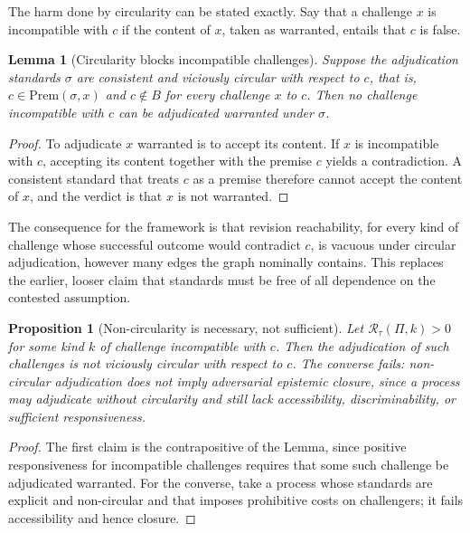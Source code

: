 \documentclass[11pt]{article}
\newtheorem{proposition}{Proposition}
\newtheorem{lemma}{Lemma}
\theoremstyle{remark}
\begin{document}
The harm done by circularity can be stated exactly. Say that a challenge $x$ is incompatible with $c$ if the content of $x$, taken as warranted, entails that $c$ is false.

\begin{lemma}[Circularity blocks incompatible challenges]
Suppose the adjudication standards $\sigma$ are consistent and viciously circular with respect to $c$, that is, $c\in\mathrm{Prem}(\sigma,x)$ and $c\notin B$ for every challenge $x$ to $c$. Then no challenge incompatible with $c$ can be adjudicated warranted under $\sigma$.
\end{lemma}

\begin{proof}
To adjudicate $x$ warranted is to accept its content. If $x$ is incompatible with $c$, accepting its content together with the premise $c$ yields a contradiction. A consistent standard that treats $c$ as a premise therefore cannot accept the content of $x$, and the verdict is that $x$ is not warranted.
\end{proof}

The consequence for the framework is that revision reachability, for every kind of challenge whose successful outcome would contradict $c$, is vacuous under circular adjudication, however many edges the graph nominally contains. This replaces the earlier, looser claim that standards must be free of all dependence on the contested assumption.

\begin{proposition}[Non-circularity is necessary, not sufficient]
Let $\mathcal R_\tau(\Pi,k)>0$ for some kind $k$ of challenge incompatible with $c$. Then the adjudication of such challenges is not viciously circular with respect to $c$. The converse fails: non-circular adjudication does not imply adversarial epistemic closure, since a process may adjudicate without circularity and still lack accessibility, discriminability, or sufficient responsiveness.
\end{proposition}

\begin{proof}
The first claim is the contrapositive of the Lemma, since positive responsiveness for incompatible challenges requires that some such challenge be adjudicated warranted. For the converse, take a process whose standards are explicit and non-circular and that imposes prohibitive costs on challengers; it fails accessibility and hence closure.
\end{proof}
\end{document}
